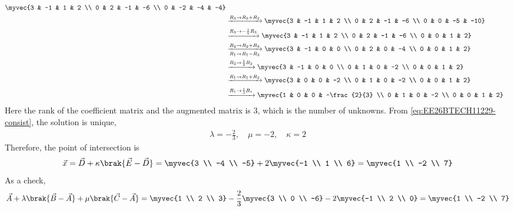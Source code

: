 \begin{enumerate}[label=\thesubsection.\arabic*, ref=\thesubsection.\theenumi]
\begin{align}
	\myvec{3 & -1 & 1 & 2 \\ 0 & 2 & -1 & -6 \\ 0 & -2 & -4 & -4}
	\nonumber \\
	&\xrightarrow{R_3 \to R_3 + R_2}
	\myvec{3 & -1 & 1 & 2 \\ 0 & 2 & -1 & -6 \\ 0 & 0 & -5 & -10}
	\nonumber \\
	&\xrightarrow{R_3 \to -\frac{1}{5}R_3}
	\myvec{3 & -1 & 1 & 2 \\ 0 & 2 & -1 & -6 \\ 0 & 0 & 1 & 2}
	\nonumber \\
	&\xrightarrow[R_1 \to R_1 - R_3]{R_2 \to R_2 + R_3}
	\myvec{3 & -1 & 0 & 0 \\ 0 & 2 & 0 & -4 \\ 0 & 0 & 1 & 2}
	\nonumber \\
	&\xrightarrow{R_2 \to \frac{1}{2}R_2}
	\myvec{3 & -1 & 0 & 0 \\ 0 & 1 & 0 & -2 \\ 0 & 0 & 1 & 2}
	\nonumber \\
	&\xrightarrow{R_1 \to R_1 + R_2}
	\myvec{3 & 0 & 0 & -2 \\ 0 & 1 & 0 & -2 \\ 0 & 0 & 1 & 2}
	\nonumber \\
	&\xrightarrow{R_1 \to \frac{1}{3}R_1}
	\myvec{1 & 0 & 0 & -\frac{2}{3} \\ 0 & 1 & 0 & -2 \\ 0 & 0 & 1 & 2}
\end{align}
Here the rank of the coefficient matrix and the augmented matrix is $3$, which is the number of unknowns. From \eqref{eq:EE26BTECH11229-consist}, the solution is unique,
\begin{align}
	\lambda = -\frac{2}{3}, \quad \mu = -2, \quad \kappa = 2
\end{align}
Therefore, the point of intersection is
\begin{align}
	\vec{x} = \vec{D} + \kappa\brak{\vec{E}-\vec{D}} = \myvec{3 \\ -4 \\ -5} + 2\myvec{-1 \\ 1 \\ 6} = \myvec{1 \\ -2 \\ 7}
\end{align}
As a check,
\begin{align}
	\vec{A} + \lambda\brak{\vec{B}-\vec{A}} + \mu\brak{\vec{C}-\vec{A}} = \myvec{1 \\ 2 \\ 3} - \frac{2}{3}\myvec{3 \\ 0 \\ -6} - 2\myvec{-1 \\ 2 \\ 0} = \myvec{1 \\ -2 \\ 7}
\end{align}


\end{enumerate}
